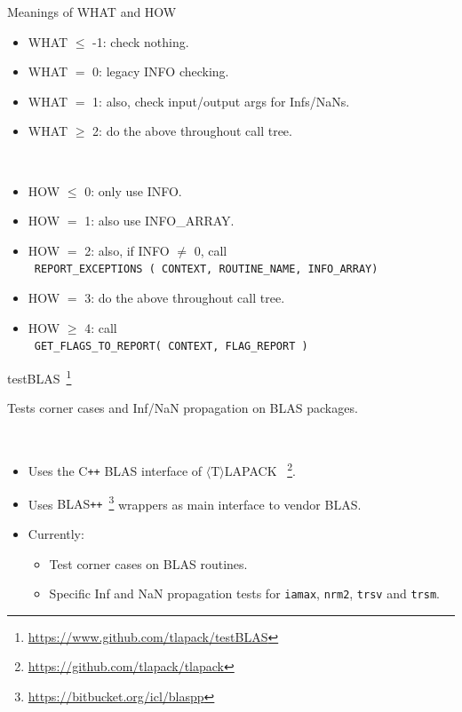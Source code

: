 \documentclass[11pt]{beamer}
\newcommand{\tlapack}{{$\langle$T$\rangle$LAPACK }}
\newcommand{\cpp}{{C\texttt{++}}}
\newcommand{\BLASPP}{{BLAS\texttt{++}}}
\begin{document}
\appendix



\begin{frame}{Meanings of WHAT and HOW}

	\begin{itemize}
		\item WHAT $\le$ -1: check nothing.
		\item WHAT $=$ 0: legacy INFO checking.
		\item WHAT $=$ 1: also, check input/output args for Infs/NaNs.
		\item WHAT $\ge$ 2: do the above throughout call tree.
	\end{itemize}

	~\\
	\begin{itemize}
		\item HOW $\le$ 0: only use INFO.
		\item HOW $=$ 1: also use INFO\_ARRAY.
		\item HOW $=$ 2: also, if INFO $\neq$ 0, call\\
			~\texttt{REPORT\_EXCEPTIONS ( CONTEXT, ROUTINE\_NAME, INFO\_ARRAY)}
		\item HOW $=$ 3: do the above throughout call tree.
		\item HOW $\ge$ 4: call\\
			~\texttt{GET\_FLAGS\_TO\_REPORT( CONTEXT, FLAG\_REPORT )}
	\end{itemize}

\end{frame}

\begin{frame}{testBLAS~\footnote{\url{https://www.github.com/tlapack/testBLAS}}}

	Tests corner cases and Inf/NaN propagation on BLAS packages.

	~\\
	\begin{itemize}
		\setlength\itemsep{1em}
		\item Uses the \cpp{} BLAS interface of \tlapack~\footnote{\url{https://github.com/tlapack/tlapack}}.
		\item Uses \BLASPP{}~\footnote{\url{https://bitbucket.org/icl/blaspp}} wrappers as main interface to vendor BLAS.
		\item Currently:
		\begin{itemize}
			\item Test corner cases on BLAS routines.
			\item Specific Inf and NaN propagation tests for \texttt{iamax}, \texttt{nrm2}, \texttt{trsv} and \texttt{trsm}.
		\end{itemize}
	\end{itemize}

\end{frame}
\end{document}
